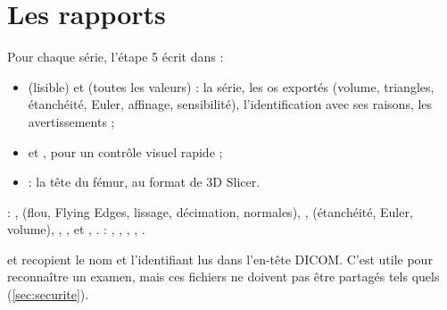\section{Les rapports}

Pour chaque série, l'étape 5 écrit dans  :
\begin{itemize}
  \item {} (lisible) et  (toutes les valeurs) : la série, les os exportés
  (volume, triangles, étanchéité, Euler, affinage, sensibilité), l'identification avec ses raisons, les avertissements ;
  \item {} et , pour un contrôle visuel rapide ;
  \item {} : la tête du fémur, au format de 3D Slicer.
\end{itemize}

\begin{danslecode}
 : ,  (flou, Flying Edges, lissage,
décimation, normales), ,  (étanchéité, Euler, volume),
, ,  et , .
 : , , ,
, .
\end{danslecode}

\begin{attention}[title={Le rapport recopie le nom du patient}]
 et  recopient le nom et l'identifiant lus dans l'en-tête DICOM. C'est
utile pour reconnaître un examen, mais ces fichiers ne doivent pas être partagés tels quels (\cref{sec:securite}).
\end{attention}
